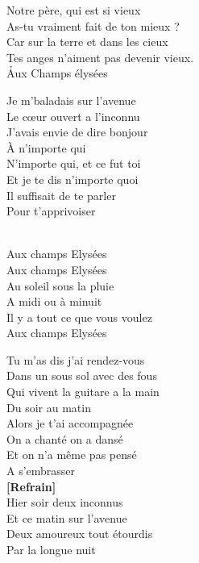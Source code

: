 \documentclass{novel}
\begin{document}
Notre père, qui est si vieux \\
As-tu vraiment fait de ton mieux ? \\
Car sur la terre et dans les cieux \\
Tes anges n'aiment pas devenir vieux. \\


\newpage
\normalsize
\h*{Aux Champs élysées}
\begin{multicols}{2}

Je m'baladais sur l'avenue \\
Le cœur ouvert a l'inconnu \\
J'avais envie de dire bonjour \\
À n'importe qui \\

N'importe qui, et ce fut toi \\
Et je te dis n'importe quoi \\
Il suffisait de te parler \\
Pour t’apprivoiser \\

\begin{bfseries}
[Refrain:]\\
Aux champs Elysées \\
Aux champs Elysées \\

Au soleil sous la pluie \\
A midi ou à minuit \\
Il y a tout ce que vous voulez \\
Aux champs Elysées \\
\end{bfseries}

Tu m’as dis j’ai rendez-vous \\
Dans un sous sol avec des fous \\
Qui vivent la guitare a la main \\
Du soir au matin \\

Alors je t’ai accompagnée \\
On a chanté on a dansé \\
Et on n’a même pas pensé \\
A s’embrasser \\

\textbf{[Refrain]}\\

Hier soir deux inconnus \\
Et ce matin sur l’avenue \\
Deux amoureux tout étourdis \\
Par la longue nuit \\


\end{multicols}
\end{document}

